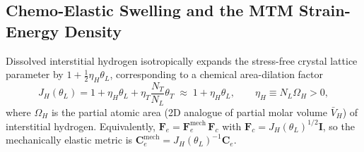 \documentclass[11pt,a4paper]{article}
\begin{document}
\subsection{Chemo-Elastic Swelling and the MTM Strain-Energy Density}

Dissolved interstitial hydrogen isotropically expands the stress-free crystal lattice parameter by $1 + \frac{1}{2}\eta_H \theta_L$, corresponding to a chemical area-dilation factor
\begin{equation}
  J_H(\theta_L) = 1 + \eta_H \theta_L + \eta_T \frac{N_T}{N_L}\theta_T \;\approx\; 1 + \eta_H \theta_L,
  \qquad \eta_H \equiv N_L \Omega_H > 0,
  \label{eq:jh_swelling}
\end{equation}
where $\Omega_H$ is the partial atomic area (2D analogue of partial molar volume $\bar{V}_H$) of interstitial hydrogen. Equivalently, $\mathbf{F}_e = \mathbf{F}_e^{\text{mech}}\,\mathbf{F}_c$ with $\mathbf{F}_c = J_H(\theta_L)^{1/2}\mathbf{I}$, so the mechanically elastic metric is $\mathbf{C}_e^{\text{mech}} = J_H(\theta_L)^{-1}\mathbf{C}_e$.
\end{document}
